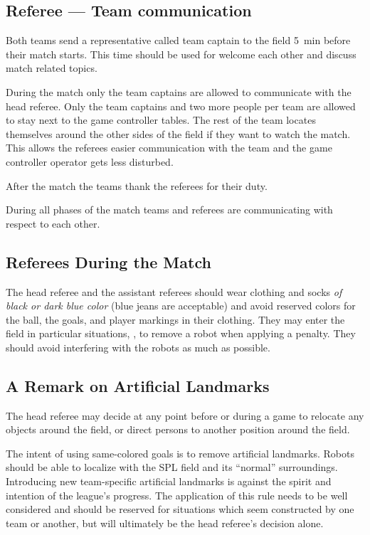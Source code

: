 \subsection{Referee — Team communication}
\label{sec:referee_team_communiation}
Both teams send a representative called team captain to the field \qty{5}{\minute} before their match starts. This time should be used for welcome each other and discuss match related topics.

During the match only the team captains are allowed to communicate with the head referee. Only the team captains and two more people per team are allowed to stay next to the game controller tables. The rest of the team locates themselves around the other sides of the field if they want to watch the match. This allows the referees easier communication with the team and the game controller operator gets less disturbed.

After the match the teams thank the referees for their duty. 

During all phases of the match teams and referees are communicating with respect to each other.

\subsection{Referees During the Match}

The head referee and the assistant referees should wear clothing and socks \emph{of black or dark blue color} (blue jeans are acceptable) and avoid reserved colors for the ball, the goals, and player markings in their clothing. They may enter the field in particular situations, \eg, to remove a robot when applying a penalty. They should avoid interfering with the robots as much as possible.

\subsection{A Remark on Artificial Landmarks}
\label{sec:judgment:landmarks}

The head referee may decide at any point before or during a game to relocate any objects around the field, or direct persons to another position around the field.

The intent of using same-colored goals is to remove artificial landmarks.
Robots should be able to localize with the SPL field and its ``normal'' surroundings.
Introducing new team-specific artificial landmarks is against the spirit and intention of the league's progress.
The application of this rule needs to be well considered and should be reserved for situations which seem constructed by one team or another, but will ultimately be the head referee's decision alone.
